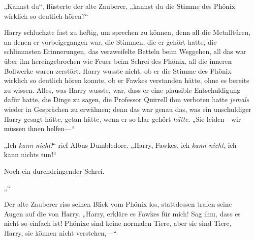 „Kannst du“, flüsterte der alte Zauberer, „kannst du die Stimme des Phönix wirklich so deutlich hören?“

Harry schluchzte fast zu heftig, um sprechen zu können, denn all die Metalltüren, an denen er vorbeigegangen war, die Stimmen, die er gehört hatte, die schlimmsten Erinnerungen, das verzweifelte Betteln beim Weggehen, all das war über ihn hereingebrochen wie Feuer beim Schrei des Phönix, all die inneren Bollwerke waren zerstört. Harry wusste nicht, ob er die Stimme des Phönix wirklich so deutlich hören konnte, ob er Fawkes verstanden hätte, ohne es bereits zu wissen. Alles, was Harry wusste, war, dass er eine plausible Entschuldigung dafür hatte, die Dinge zu sagen, die Professor Quirrell ihm verboten hatte \emph{jemals} wieder in Gesprächen zu erwähnen; denn das war genau das, was ein unschuldiger Harry gesagt hätte, getan hätte, wenn er so klar gehört \emph{hätte}. „Sie leiden—wir müssen ihnen helfen—“

„Ich \emph{kann nicht!}“ rief Albus Dumbledore. „Harry, Fawkes, ich \emph{kann nicht}, ich kann nichts tun!“

Noch ein durchdringender Schrei.

„“

Der alte Zauberer riss seinen Blick vom Phönix los, stattdessen trafen seine Augen auf die von Harry. „Harry, erkläre es Fawkes für mich! Sag ihm, dass es nicht so einfach ist! Phönixe sind keine normalen Tiere, aber sie sind Tiere, Harry, sie können nicht verstehen,—“

